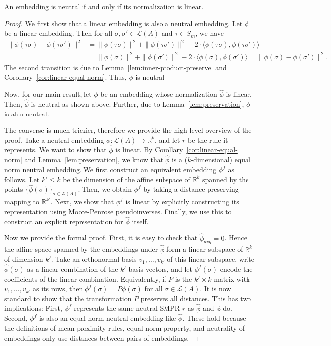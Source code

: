 \documentclass[prodmode]{acmsmall-ec14}
\newcommand{\calL}{{\mathcal{L}}}
\newcommand{\rank}{{\calL(A)}}
\begin{document}
\begin{theorem}
An embedding is neutral if and only if its normalization is linear. 
\label{thm:neutral-linear}
\end{theorem}
\begin{proof}
We first show that a linear embedding is also a neutral embedding. Let $\phi$ be a linear embedding. Then for all $\sigma,\sigma' \in \rank$ and $\tau \in S_m$, we have
\begin{align*}
\|\phi(\tau \sigma)-\phi(\tau \sigma')\|^2 &= \|\phi(\tau \sigma)\|^2 + \|\phi(\tau \sigma')\|^2 - 2\cdot \langle \phi(\tau \sigma), \phi(\tau \sigma') \rangle \\
&= \|\phi(\sigma)\|^2 + \|\phi(\sigma')\|^2 - 2\cdot \langle \phi(\sigma), \phi(\sigma') \rangle = \|\phi(\sigma)-\phi(\sigma')\|^2.
\end{align*}
The second transition is due to Lemma~\ref{lem:inner-product-preserve} and Corollary~\ref{cor:linear-equal-norm}. Thus, $\phi$ is neutral. 

Now, for our main result, let $\phi$ be an embedding whose normalization $\hat{\phi}$ is linear. Then, $\hat{\phi}$ is neutral as shown above. Further, due to Lemma~\ref{lem:preservation}, $\phi$ is also neutral.

The converse is much trickier, therefore we provide the high-level overview of the proof. Take a neutral embedding $\phi : \rank \rightarrow \mathbb{R}^k$, and let $r$ be the rule it represents. We want to show that $\hat{\phi}$ is linear. By Corollary~\ref{cor:linear-equal-norm} and Lemma~\ref{lem:preservation}, we know that $\hat{\phi}$ is a ($k$-dimensional) equal norm neutral embedding. We first construct an equivalent embedding $\phi^f$ as follows. Let $k' \le k$ be the dimension of the affine subspace of $\mathbb{R}^k$ spanned by the points $\{\hat{\phi}(\sigma)\}_{\sigma \in \rank}$. Then, we obtain $\phi^f$ by taking a distance-preserving mapping to $\mathbb{R}^{k'}$. Next, we show that $\phi^f$ is linear by explicitly constructing its representation using Moore-Penrose pseudoinverses. Finally, we use this to construct an explicit representation for $\hat{\phi}$ itself. 

Now we provide the formal proof. First, it is easy to check that $\hat{\phi}_{avg} = 0$. Hence, the affine space spanned by the embeddings under $\hat{\phi}$ form a linear subspace of $\mathbb{R}^k$ of dimension $k'$. Take an orthonormal basis $v_1,\ldots,v_{k'}$ of this linear subspace, write $\hat{\phi}(\sigma)$ as a linear combination of the $k'$ basis vectors, and let $\phi^f(\sigma)$ encode the coefficients of the linear combination. Equivalently, if $P$ is the $k' \times k$ matrix with $v_1,\ldots,v_{k'}$ as its rows, then $\phi^f(\sigma) = P \phi(\sigma)$ for all $\sigma \in \rank$. It is now standard to show that the transformation $P$ preserves all distances. This has two implications: First, $\phi^f$ represents the same neutral SMPR $r$ as $\hat{\phi}$ and $\phi$ do. Second, $\phi^f$ is also an equal norm neutral embedding like $\hat{\phi}$. These hold because the definitions of mean proximity rules, equal norm property, and neutrality of embeddings only use distances between pairs of embeddings. 


\end{proof}
\end{document}
